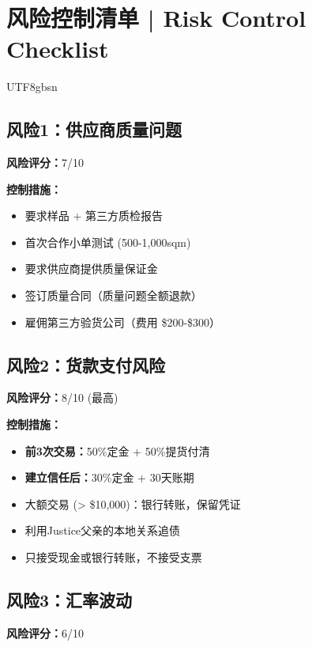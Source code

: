 \documentclass[12pt,a4paper]{article}
\begin{document}
\newpage

\section{风险控制清单 | Risk Control Checklist}

\begin{CJK}{UTF8}{gbsn}

\subsection{风险1：供应商质量问题}

\textbf{风险评分：}7/10

\textbf{控制措施：}
\begin{itemize}
    \item 要求样品 + 第三方质检报告
    \item 首次合作小单测试 (500-1,000sqm)
    \item 要求供应商提供质量保证金
    \item 签订质量合同（质量问题全额退款）
    \item 雇佣第三方验货公司（费用 \$200-\$300）
\end{itemize}

\subsection{风险2：货款支付风险}

\textbf{风险评分：}8/10 (最高)

\textbf{控制措施：}
\begin{itemize}
    \item \textbf{前3次交易：}50\%定金 + 50\%提货付清
    \item \textbf{建立信任后：}30\%定金 + 30天账期
    \item 大额交易 (> \$10,000)：银行转账，保留凭证
    \item 利用Justice父亲的本地关系追债
    \item 只接受现金或银行转账，不接受支票
\end{itemize}

\subsection{风险3：汇率波动}

\textbf{风险评分：}6/10


\end{CJK}
\end{document}
